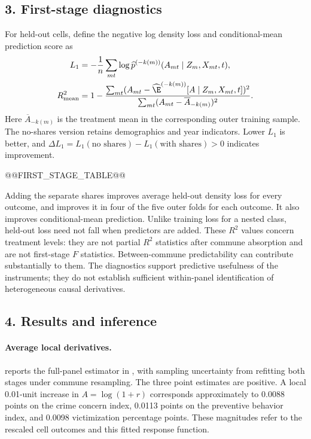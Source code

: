 \subsection*{3. First-stage diagnostics}
For held-out cells, define the negative log density loss and conditional-mean prediction score as
\begin{align}
L_1&=-\frac1n\sum_{mt}\log\widehat p^{(-k(m))}(A_{mt}\mid Z_m,X_{mt},t),\\
R^2_{\mathrm{mean}}&=1-
\frac{\sum_{mt}(A_{mt}-\widehat{\E}^{(-k(m))}[A\mid Z_m,X_{mt},t])^2}
{\sum_{mt}(A_{mt}-\overline A_{-k(m)})^2}.
\end{align}
Here $\overline A_{-k(m)}$ is the treatment mean in the corresponding outer training sample. The no-shares version retains demographics and year indicators. Lower $L_1$ is better, and $\Delta L_1=L_1(\text{no shares})-L_1(\text{with shares})>0$ indicates improvement.

@@FIRST_STAGE_TABLE@@

Adding the separate shares improves average held-out density loss for every outcome, and improves it in four of the five outer folds for each outcome. It also improves conditional-mean prediction. Unlike training loss for a nested class, held-out loss need not fall when predictors are added. These $R^2$ values concern treatment levels: they are not partial $R^2$ statistics after commune absorption and are not first-stage $F$ statistics. Between-commune predictability can contribute substantially to them. The diagnostics support predictive usefulness of the instruments; they do not establish sufficient within-panel identification of heterogeneous causal derivatives.

\subsection*{4. Results and inference}
\paragraph{Average local derivatives.}
 reports the full-panel estimator in , with sampling uncertainty from refitting both stages under commune resampling. The three point estimates are positive. A local 0.01-unit increase in $A=\log(1+r)$ corresponds approximately to 0.0088 points on the crime concern index, 0.0113 points on the preventive behavior index, and 0.0098 victimization percentage points. These magnitudes refer to the rescaled cell outcomes and this fitted response function.

